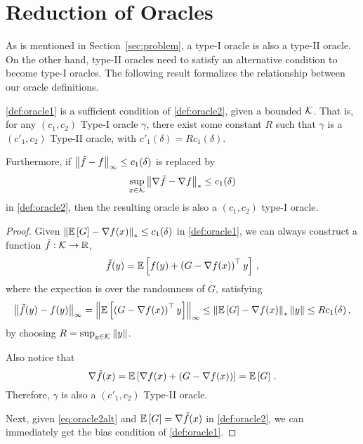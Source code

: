 

\section{Reduction of Oracles}
\label{sec:orrel}

As is mentioned in Section~\ref{sec:problem}, a type-I oracle is also a type-II oracle. On the other hand, type-II oracles need to satisfy an alternative condition to become type-I oracles. The following result formalizes the relationship between our oracle definitions.
\begin{theorem}\label{thm:typered}
\cref{def:oracle1} is a sufficient condition of \cref{def:oracle2}, given a bounded $\mathcal{K}$. That is, for any $(c_1,c_2)$ Type-I oracle $\gamma$, there exist some constant $R$ such that  $\gamma$ is a $(c'_1,c_2)$ Type-II oracle, with $c'_1(\delta)=Rc_1(\delta)$.

Furthermore, if $\left\|\tilde{f}-f\right\|_\infty \le c_1(\delta)$ is replaced by 
\begin{align}
\label{eq:oracle2alt}
\sup_{x\in \mathcal{K}}\left\|\nabla \tilde{f}- \nabla f\right\|_* \le c_1(\delta)
\end{align}
in \cref{def:oracle2}, then the resulting oracle is also a $(c_1,c_2)$ type-I oracle.
\end{theorem}

\begin{proof}
Given $\left\| \mathbb{E}\left[G\right]  - \nabla f(x)  \right\|_* \le c_1(\delta) $ in \cref{def:oracle1}, we can always construct a function $\tilde{f}:\mathcal{K} \to \mathbb{R}$,
\[
\tilde{f}(y) =\mathbb{E}\left[ f(y)+ \left( G-\nabla f(x) \right)^\top y\right] \,,
\]
where the expection is over the randomness of $G$, satisfying
\begin{align*}
\left\|\tilde{f}(y)-f(y)\right\|_{\infty}
=
 \left\| \mathbb{E}\left[\left( G-\nabla f(x) \right)^\top y\right]\right\|_{\infty}
 \le \left\|\mathbb{E}\left[G\right]-\nabla f(x)\right\|_* \left\|y\right\|
 \le  Rc_1(\delta)\,,
\end{align*}
by choosing $R = \sup_{y \in \mathcal{K}}\left\|y\right\|$.

Also notice that
\[
 \nabla \tilde{f}(x) = \mathbb{E}\left[\nabla f(x)+ \left( G-\nabla f(x)\right)\right]
 =\mathbb{E}\left[G\right]\,.
\]
Therefore, $\gamma$ is also a $(c'_1,c_2)$ Type-II oracle.

Next, given \eqref{eq:oracle2alt} and $\mathbb{E}\left[G\right]=\nabla \tilde{f}(x)$ in \cref{def:oracle2}, we can immediately get the bias condition of \cref{def:oracle1}.
\end{proof}




